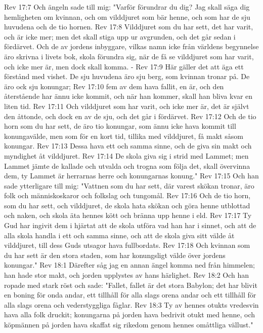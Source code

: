 Rev 17:7  Och ängeln sade till mig: "Varför förundrar du dig? Jag skall säga dig hemligheten om kvinnan, och om vilddjuret som bär henne, och som har de sju huvudena och de tio hornen.
Rev 17:8  Vilddjuret som du har sett, det har varit, och är icke mer; men det skall stiga upp ur avgrunden, och det går sedan i fördärvet. Och de av jordens inbyggare, vilkas namn icke från världens begynnelse äro skrivna i livets bok, skola förundra sig, när de få se vilddjuret som har varit, och icke mer är, men dock skall komma. -
Rev 17:9  Här gäller det att äga ett förstånd med vishet. De sju huvudena äro sju berg, som kvinnan tronar på. De äro ock sju konungar;
Rev 17:10  fem av dem hava fallit, en är, och den återstående har ännu icke kommit, och när han kommer, skall han bliva kvar en liten tid.
Rev 17:11  Och vilddjuret som har varit, och icke mer är, det är självt den åttonde, och dock en av de sju, och det går i fördärvet.
Rev 17:12  Och de tio horn som du har sett, de äro tio konungar, som ännu icke hava kommit till konungavälde, men som för en kort tid, tillika med vilddjuret, få makt såsom konungar.
Rev 17:13  Dessa hava ett och samma sinne, och de giva sin makt och myndighet åt vilddjuret.
Rev 17:14  De skola giva sig i strid med Lammet; men Lammet jämte de kallade och utvalda och trogna som följa det, skall övervinna dem, ty Lammet är herrarnas herre och konungarnas konung."
Rev 17:15  Och han sade ytterligare till mig: "Vattnen som du har sett, där varest skökan tronar, äro folk och människoskaror och folkslag och tungomål.
Rev 17:16  Och de tio horn, som du har sett, och vilddjuret, de skola hata skökan och göra henne utblottad och naken, och skola äta hennes kött och bränna upp henne i eld.
Rev 17:17  Ty Gud har ingivit dem i hjärtat att de skola utföra vad han har i sinnet, och att de alla skola handla i ett och samma sinne, och att de skola giva sitt välde åt vilddjuret, till dess Guds utsagor hava fullbordats.
Rev 17:18  Och kvinnan som du har sett är den stora staden, som har konungsligt välde över jordens konungar."
Rev 18:1  Därefter såg jag en annan ängel komma ned från himmelen; han hade stor makt, och jorden upplystes av hans härlighet.
Rev 18:2  Och han ropade med stark röst och sade: "Fallet, fallet är det stora Babylon; det har blivit en boning för onda andar, ett tillhåll för alla slags orena andar och ett tillhåll för alla slags orena och vederstyggliga fåglar.
Rev 18:3  Ty av hennes otukts vredesvin hava alla folk druckit; konungarna på jorden hava bedrivit otukt med henne, och köpmännen på jorden hava skaffat sig rikedom genom hennes omåttliga vällust."
